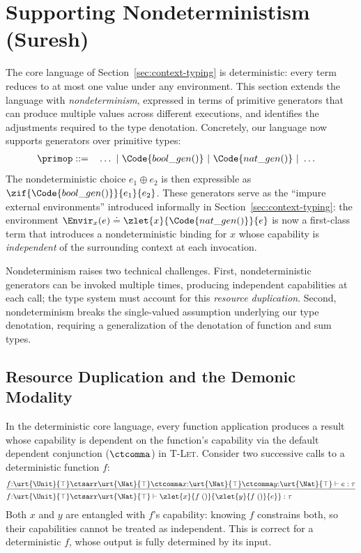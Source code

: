 \section{Supporting Nondeterministism (Suresh)}\label{sec:extension}

The core language of Section~\ref{sec:context-typing} is
deterministic: every term reduces to at most one value under any
environment.  This section extends the language with
\emph{nondeterminism}, expressed in terms of primitive generators that
can produce multiple values across different executions, and
identifies the adjustments required to the type denotation.
Concretely, our language now supports generators over primitive types:
\begin{align*}
  \primop ::= \quad & \ldots ~|~ \Code{bool\_gen()} ~|~
  \Code{nat\_gen()} ~|~ \ldots
\end{align*}
The nondeterministic choice $e_1 \oplus e_2$ is then expressible as
$\zif{\Code{bool\_gen()}}{e_1}{e_2}$.  These generators serve as the
``impure external environments'' introduced informally in
Section~\ref{sec:context-typing}: the environment $\Envir_x(e) \doteq
\zlet{x}{\Code{nat\_gen()}}{e}$ is now a first-class term that
introduces a nondeterministic binding for $x$ whose capability is
\emph{independent} of the surrounding context at each invocation.

Nondeterminism raises two technical challenges.  First, nondeterministic
generators can be invoked multiple times, producing independent
capabilities at each call; the type system must account for this
\emph{resource duplication}.  Second, nondeterminism breaks the
single-valued assumption underlying our type denotation, requiring a
generalization of the denotation of function and sum types.

\subsection{Resource Duplication and the Demonic Modality}\label{subsec:duplication}

In the deterministic core language, every function application produces
a result whose capability is dependent on the function's capability via
the default dependent conjunction ($\ctcomma$) in \textsc{T-Let}.  Consider two
successive calls to a deterministic function $f$:
\begin{align*}
  &\underline{f{:}\urt{\Unit}{\top} \ctsarr \urt{\Nat}{\top}
    \ctcomma x{:}\urt{\Nat}{\top} \ctcomma y{:}\urt{\Nat}{\top}
    \vdash e : \tau}
  \\&f{:}\urt{\Unit}{\top} \ctsarr \urt{\Nat}{\top} \vdash
    \zlet{x}{f\;()}{\zlet{y}{f\;()}{e}} : \tau
\end{align*}
Both $x$ and $y$ are entangled with $f$'s capability: knowing $f$
constrains both, so their capabilities cannot be treated as
independent.  This is correct for a deterministic $f$, whose output
is fully determined by its input.

